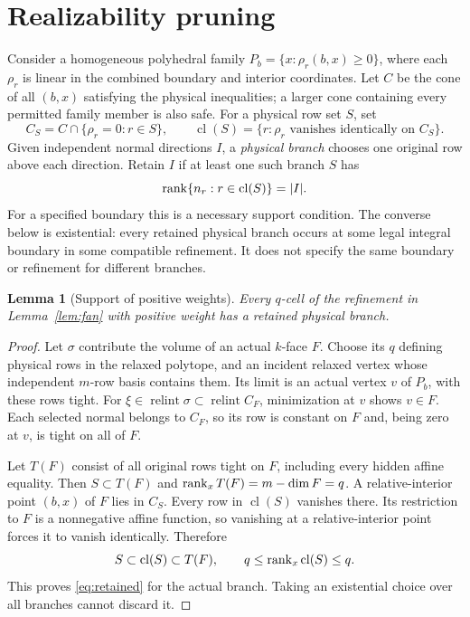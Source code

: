 \documentclass[11pt]{article}
\newtheorem{lemma}[theorem]{Lemma}
\theoremstyle{definition}\newtheorem{definition}[theorem]{Definition}
\theoremstyle{remark}\newtheorem{remark}[theorem]{Remark}
\newcommand{\relint}{\operatorname{relint}}\newcommand{\cl}{\operatorname{cl}}
\begin{document}
\section{Realizability pruning}\label{sec:pruning}
Consider a homogeneous polyhedral family
\(P_b=\{x:\rho_r(b,x)\geq0\}\), where each \(\rho_r\) is linear in
the combined boundary and interior coordinates. Let \(C\) be the cone
of all \((b,x)\) satisfying the physical inequalities; a larger cone
containing every permitted family member is also safe. For a physical row
set \(S\), set
\[
 C_S=C\cap\{\rho_r=0:r\in S\},\qquad
 \cl(S)=\{r:\rho_r\text{ vanishes identically on }C_S\}.
\]
Given independent normal directions \(I\), a \emph{physical branch}
chooses one original row above each direction. Retain \(I\) if at least
one such branch \(S\) has
\begin{equation}\label{eq:retained}
 \rank\{n_r:r\in\cl(S)\}=|I|.
\end{equation}
For a specified boundary this is a necessary support condition. The converse
below is existential: every retained physical branch occurs at some legal
integral boundary in some compatible refinement. It does not specify the
same boundary or refinement for different branches.

\begin{lemma}[Support of positive weights]\label{lem:support}
Every \(q\)-cell of the refinement in Lemma~\ref{lem:fan} with positive
weight has a retained physical branch.
\end{lemma}
\begin{proof}
Let \(\sigma\) contribute the volume of an actual \(k\)-face \(F\).
Choose its \(q\) defining physical rows in the relaxed polytope, and an
incident relaxed vertex whose independent \(m\)-row basis contains them.
Its limit is an actual vertex \(v\) of \(P_b\), with these rows tight.
For \(\xi\in\relint\sigma\subset\relint C_F\), minimization at \(v\)
shows \(v\in F\). Each selected normal belongs to \(C_F\), so its row
is constant on \(F\) and, being zero at \(v\), is tight on all of \(F\).

Let \(T(F)\) consist of all original rows tight on \(F\), including
every hidden affine equality. Then
\(S\subset T(F)\) and \(\operatorname{rank}_x T(F)=m-\dim F=q\).
A relative-interior point \((b,x)\) of \(F\) lies in \(C_S\).
Every row in \(\cl(S)\) vanishes there. Its restriction to \(F\) is a
nonnegative affine function, so vanishing at a relative-interior point
forces it to vanish identically. Therefore
\[
 S\subset\cl(S)\subset T(F),\qquad
 q\leq\rank_x\cl(S)\leq q.
\]
This proves \eqref{eq:retained} for the actual branch. Taking an existential
choice over all branches cannot discard it.
\end{proof}
\end{document}
